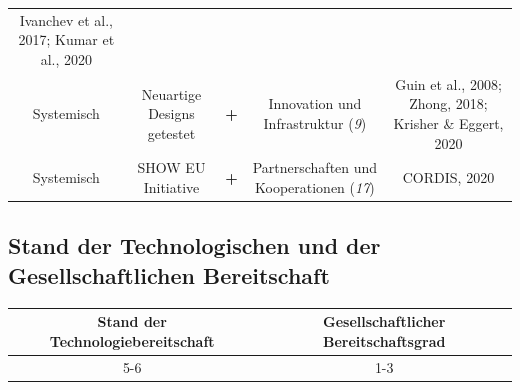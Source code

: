 \documentclass[
]{book}
\begin{document}
\begin{longtable}[]{@{}ccccc@{}}
\begin{minipage}[t]{0.17\columnwidth}
Ivanchev et al., 2017; Kumar et al., 2020\strut
\end{minipage}\tabularnewline
\begin{minipage}[t]{0.17\columnwidth}\centering
Systemisch\strut
\end{minipage} & \begin{minipage}[t]{0.16\columnwidth}\centering
Neuartige Designs getestet\strut
\end{minipage} & \begin{minipage}[t]{0.17\columnwidth}\centering
\textbf{+}\strut
\end{minipage} & \begin{minipage}[t]{0.17\columnwidth}\centering
Innovation und Infrastruktur (\emph{9})\strut
\end{minipage} & \begin{minipage}[t]{0.17\columnwidth}\centering
Guin et al., 2008; Zhong, 2018; Krisher \& Eggert, 2020\strut
\end{minipage}\tabularnewline
\begin{minipage}[t]{0.17\columnwidth}\centering
Systemisch\strut
\end{minipage} & \begin{minipage}[t]{0.16\columnwidth}\centering
SHOW EU Initiative\strut
\end{minipage} & \begin{minipage}[t]{0.17\columnwidth}\centering
\textbf{+}\strut
\end{minipage} & \begin{minipage}[t]{0.17\columnwidth}\centering
Partnerschaften und Kooperationen (\emph{17})\strut
\end{minipage} & \begin{minipage}[t]{0.17\columnwidth}\centering
CORDIS, 2020\strut
\end{minipage}\tabularnewline
\bottomrule
\end{longtable}

\hypertarget{stand-der-technologischen-und-der-gesellschaftlichen-bereitschaft}{%
\subsection*{Stand der Technologischen und der Gesellschaftlichen Bereitschaft}\label{stand-der-technologischen-und-der-gesellschaftlichen-bereitschaft}}

\begin{longtable}[]{@{}cc@{}}
\toprule
Stand der Technologiebereitschaft & Gesellschaftlicher Bereitschaftsgrad\tabularnewline
\midrule
\endhead
5-6 & 1-3\tabularnewline
\bottomrule
\end{longtable}
\end{document}
